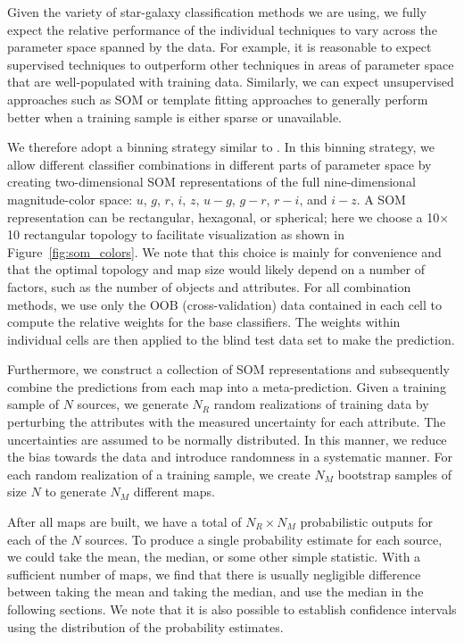 Given the variety of star-galaxy classification methods
we are using,
we fully expect the relative performance
of the individual techniques to vary across
the parameter space spanned by the data.
For example, it is reasonable to expect 
supervised techniques to outperform other techniques
in areas of parameter space that are well-populated
with training data.
Similarly, we can expect unsupervised approaches
such as SOM or template fitting approaches 
to generally perform better when a training sample
is either sparse or unavailable.

We therefore adopt a binning strategy similar to 
\cite{carrascokind2014exhausting}.
In this binning strategy,
we allow different classifier combinations 
in different parts of parameter space
by creating two-dimensional SOM representations of
the full nine-dimensional magnitude-color space:
$u$, $g$, $r$, $i$, $z$, $u-g$, $g-r$, $r-i$, and $i-z$.
A SOM representation can be rectangular, hexagonal, or spherical;
here we choose a 10$\times$10 rectangular topology to facilitate 
visualization as shown in Figure~\ref{fig:som_colors}.
We note that this choice is mainly for convenience
and that the optimal topology and map size would likely depend on
a number of factors, such as the number of objects and attributes.
For all combination methods,
we use only the OOB (cross-validation) data contained in each cell
to compute the relative weights for the base classifiers.
The weights within individual cells are then applied to
the blind test data set to make the prediction.

Furthermore, we construct a collection of SOM representations
and subsequently combine the predictions from each map
into a meta-prediction.
Given a training sample of $N$ sources,
we generate $N_R$ random realizations of training data
by perturbing the attributes
with the measured uncertainty for each attribute.
The uncertainties are assumed to be normally distributed.
In this manner,
we reduce the bias towards the data
and introduce randomness in a systematic manner.
For each random realization of a training sample,
we create $N_M$ bootstrap samples of size $N$
to generate $N_M$ different maps.

After all maps are built,
we have a total of $N_R \times N_M$ probabilistic outputs
for each of the $N$ sources.
To produce a single probability estimate for each source,
we could take the mean, the median, or some other simple statistic.
With a sufficient number of maps,
we find that there is usually negligible difference
between taking the mean and taking the median, and
use the median in the following sections.
We note that it is also possible to establish confidence intervals
using the distribution of the probability estimates.

